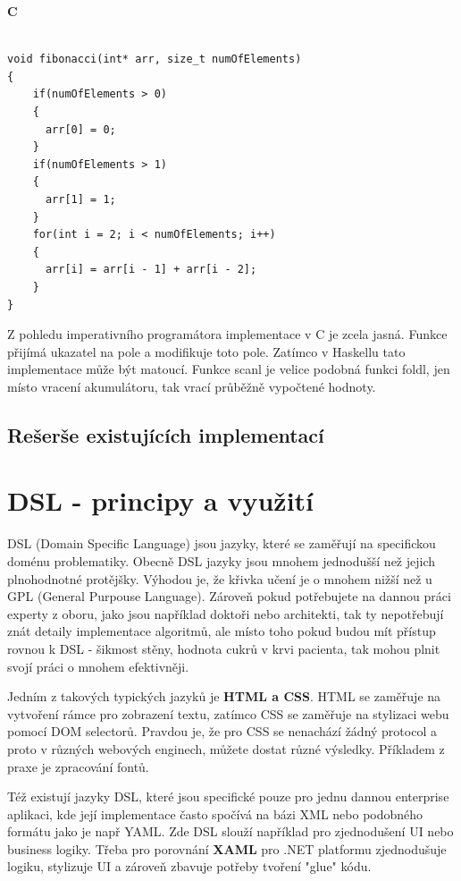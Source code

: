 \documentclass[male,czech]{kithesis}
\begin{document}
\pagebreak

\textbf{C}
\begin{verbatim}

void fibonacci(int* arr, size_t numOfElements)
{
    if(numOfElements > 0)
    {
      arr[0] = 0;
    }
    if(numOfElements > 1)
    {
      arr[1] = 1;
    }
    for(int i = 2; i < numOfElements; i++)
    {
      arr[i] = arr[i - 1] + arr[i - 2];
    }
}

\end{verbatim}

Z pohledu imperativního programátora implementace v C je zcela jasná. Funkce přijímá ukazatel na
pole a modifikuje toto pole. Zatímco v Haskellu tato implementace může být matoucí. Funkce scanl je 
velice podobná funkci foldl, jen místo vracení akumulátoru, tak vrací průběžně vypočtené hodnoty.

\section{Rešerše existujících implementací}

\chapter{DSL - principy a využití}
DSL (Domain Specific Language) jsou jazyky, které se zaměřují na specifickou doménu problematiky.
Obecně DSL jazyky jsou mnohem jednodušší než jejich plnohodnotné protějšky. Výhodou je, že 
křivka učení je o mnohem nižší než u GPL (General Purpouse Language). Zároveň pokud potřebujete
na dannou práci experty z oboru, jako jsou například doktoři nebo architekti, tak ty nepotřebují znát detaily 
implementace algoritmů, ale místo toho pokud budou mít přístup rovnou k DSL - šikmost stěny,
hodnota cukrů v krvi pacienta, tak mohou plnit svojí práci o mnohem efektivněji. \cite{DomainSpecificLanguages}

Jedním z takových typických jazyků je \textbf{HTML a CSS}. HTML se zaměřuje na vytvoření rámce pro zobrazení textu,
zatímco CSS se zaměřuje na stylizaci webu pomocí DOM selectorů. Pravdou je, že pro CSS se nenachází žádný 
protocol a proto v různých webových enginech, můžete dostat různé výsledky. Příkladem z praxe je zpracování
fontů.

Též existují jazyky DSL, které jsou specifické pouze pro jednu dannou enterprise aplikaci, kde její implementace
často spočívá na bázi XML nebo podobného formátu jako je např YAML. Zde DSL slouží například pro 
zjednodušení UI nebo business logiky. Třeba pro porovnání \textbf{XAML} pro .NET platformu zjednodušuje logiku, 
stylizuje UI a zároveň zbavuje potřeby tvoření "glue" kódu.
\end{document}
